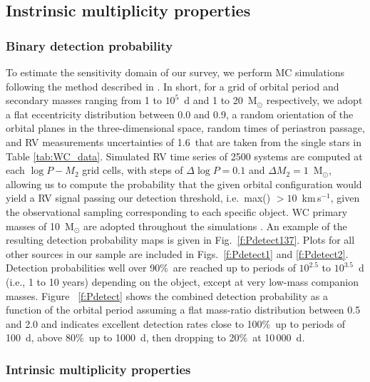 \subsection{Instrinsic multiplicity properties}\label{s:intMultiplicityProp}
\subsubsection{Binary detection probability}\label{s:detect}
To estimate the sensitivity domain of our survey, we perform MC simulations following the method described in \citet{patrick_red_2019}. In short, for a grid of orbital period and secondary masses ranging from 1 to $10^5$~d and 1 to 20~M$_{\odot}$ respectively, we adopt a flat eccentricity distribution between 0.0 and 0.9, a random orientation of the orbital planes in the three-dimensional space, random times of periastron passage, and RV measurements uncertainties of 1.6\,\kms{} that are taken from the single stars in Table \ref{tab:WC_data}. Simulated RV time series of 2500 systems are computed at each $\log P - M_2$ grid cells, with steps of $\Delta \log P =0.1$ and $\Delta M_2=1$~M$_{\odot}$, allowing us to compute the probability that the given orbital configuration would yield a RV signal passing our detection threshold, i.e.\ max(\DelRV{}) $> 10$~km\,s$^{-1}$, given the observational sampling corresponding to each specific object. WC primary masses of 10~M$_{\odot}$ are adopted throughout the simulations \citep[cf.][]{massey_spectroscopic_1981}. An example of the resulting detection probability maps is given in Fig.~\ref{f:Pdetect137}. Plots for all other sources in our sample are included in Figs.~\ref{f:Pdetect1} and \ref{f:Pdetect2}. Detection probabilities well over 90\%\ are reached up to periods of $10^{2.5}$ to $10^{3.5}$~d (i.e., 1 to 10 years) depending on the object, except at very low-mass companion masses. Figure ~\ref{f:Pdetect} shows the combined detection probability as a function of the orbital period assuming a flat mass-ratio distribution between 0.5 and 2.0 \citep[e.g., as in][]{langer_properties_2020} and indicates excellent detection rates close to 100\%\ up to periods of 100~d, above 80\%\ up to 1000~d, then dropping to 20\%\ at 10\,000~d.
\subsubsection{Intrinsic multiplicity properties}\label{subs:intMulProp}

